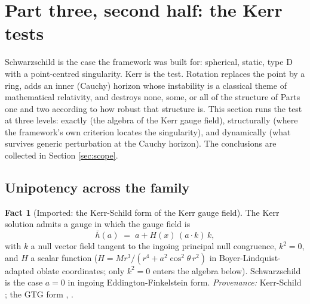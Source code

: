 \documentclass[11pt]{article}
\theoremstyle{definition}
\newtheorem{fact}[theorem]{Fact}
\newcommand{\hb}{\bar{h}}
\begin{document}
\section{Part three, second half: the Kerr tests}\label{sec:kerr}

Schwarzschild is the case the framework was built for: spherical, static, type D with a point-centred singularity. Kerr is the test. Rotation replaces the point by a ring, adds an inner (Cauchy) horizon whose instability is a classical theme of mathematical relativity, and destroys none, some, or all of the structure of Parts one and two according to how robust that structure is. This section runs the test at three levels: exactly (the algebra of the Kerr gauge field), structurally (where the framework's own criterion locates the singularity), and dynamically (what survives generic perturbation at the Cauchy horizon). The conclusions are collected in Section \ref{sec:scope}.

\subsection{Unipotency across the family}\label{subsec:kerrschild}

\begin{fact}[Imported: the Kerr-Schild form of the Kerr gauge field]\label{fact:kerrschild}
The Kerr solution admits a gauge in which the gauge field is
\[
\hb(a) \;=\; a + H(x)\,(a\cdot k)\,k ,
\]
with $k$ a null vector field tangent to the ingoing principal null congruence, $k^2 = 0$, and $H$ a scalar function ($H = Mr^3/(r^4 + a^2\cos^2\theta\, r^2)$ in Boyer-Lindquist-adapted oblate coordinates; only $k^2 = 0$ enters the algebra below). Schwarzschild is the case $a = 0$ in ingoing Eddington-Finkelstein form. \emph{Provenance:} Kerr-Schild \cite{KerrSchild1965}; the GTG form \cite[Ch.~14]{DoranLasenby2003}, \cite{LDG1998}.
\end{fact}
\end{document}
